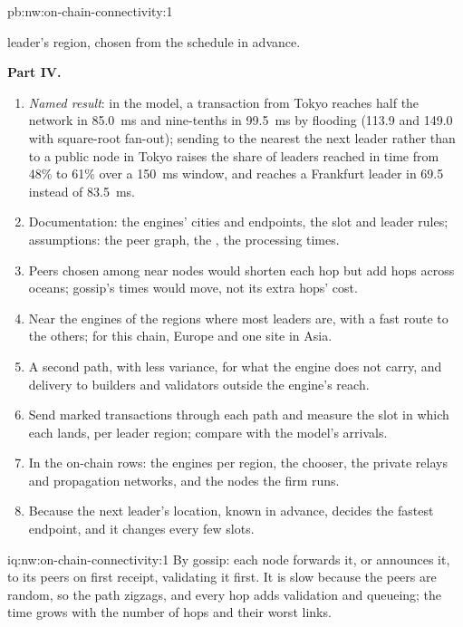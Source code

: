 \begin{solution}{pb:nw:on-chain-connectivity:1}
\begin{enumerate}[resume]
  leader's region, chosen from the schedule in advance.
\end{enumerate}
\textbf{Part IV.}
\begin{enumerate}[resume]
\item \emph{Named result}: in the model, a transaction from Tokyo reaches half the network in \qty{85.0}{\milli\second} and nine-tenths in
  \qty{99.5}{\milli\second} by flooding (113.9 and 149.0 with square-root fan-out); sending to the  nearest the next leader rather than to a
  public node in Tokyo raises the share of leaders reached in time from 48\% to 61\% over a \qty{150}{\milli\second} window, and reaches a Frankfurt
  leader in 69.5 instead of \qty{83.5}{\milli\second}.
\item Documentation: the engines' cities and endpoints, the slot and leader rules; assumptions: the peer graph, the , the processing times.
\item Peers chosen among near nodes would shorten each hop but add hops across oceans; gossip's times would move, not its extra hops' cost.
\item Near the engines of the regions where most leaders are, with a fast route to the others; for this chain, Europe and one site in Asia.
\item A second path, with less variance, for what the engine does not carry, and delivery to builders and validators outside the engine's reach.
\item Send marked transactions through each path and measure the slot in which each lands, per leader region; compare with the model's arrivals.
\item In the on-chain rows: the engines per region, the chooser, the private relays and propagation networks, and the nodes the firm runs.
\item Because the next leader's location, known in advance, decides the fastest endpoint, and it changes every few slots.
\end{enumerate}
\end{solution}

\begin{solution}{iq:nw:on-chain-connectivity:1}
By gossip: each node forwards it, or announces it, to its peers on first receipt, validating it first. It is slow because the peers are random, so the
path zigzags, and every hop adds validation and queueing; the time grows with the number of hops and their worst links.
\end{solution}

